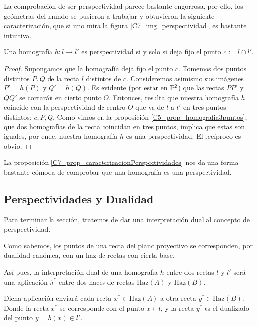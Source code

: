 La comprobación de ser perspectividad parece bastante engorrosa, por ello, los geómetras del mundo se pusieron a trabajar y obtuvieron la siguiente caracterización, que si uno mira la figura \ref{C7_img_perspectividad}, es bastante intuitiva.
\begin{prop}
	\label{C7_prop_caracterizacionPerspectividades}
	Una homografía $h:l\to l'$ es perspectividad si y solo si deja fijo el punto $c:=l\cap l'$.
\end{prop}
\begin{proof}
	Supongamos que la homografía deja fijo el punto $c$. Tomemos dos puntos distintos $P,Q$ de la recta $l$ distintos de $c$. Consideremos asimismo sus imágenes $P'=h(P)$ y $Q'=h(Q)$. Es evidente (por estar en $\mathbb{P}^2$) que las rectas $PP'$ y $QQ'$ se cortarán en cierto punto $O$. Entonces, resulta que nuestra homografía $h$ coincide con la perspectividad de centro $O$ que va de $l$ a $l'$ en tres puntos distintos; $c, P, Q$. Como vimos en la proposición \ref{C5_prop_homografia3puntos}, que dos homografías de la recta coincidan en tres puntos, implica que estas son iguales, por ende, nuestra homografía $h$ es una perspectividad. El recíproco es obvio.
\end{proof}
La proposición \ref{C7_prop_caracterizacionPerspectividades} nos da una forma bastante cómoda de comprobar que una homografía es una perspectividad.
\subsection{Perspectividades y Dualidad}
Para terminar la sección, tratemos de dar una interpretación dual al concepto de perspectividad.

Como sabemos, los puntos de una recta del plano proyectivo se corresponden, por dualidad canónica, con un haz de rectas con cierta base.

Así pues, la interpretación dual de una homografía $h$ entre dos rectas $l$ y $l'$ será una aplicación $h^*$ entre dos haces de rectas $\text{Haz}(A)$ y $\text{Haz}(B)$.

Dicha aplicación enviará cada recta $x^*\in\text{Haz}(A)$ a otra recta $y^*\in\text{Haz}(B)$. Donde la recta $x^*$ se corresponde con el punto $x\in l$, y la recta $y^*$ es el dualizado del punto $y=h(x)\in l'$.

